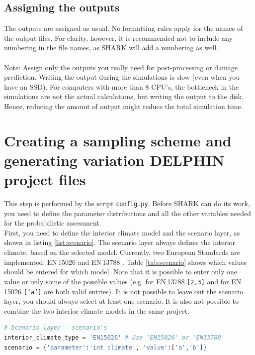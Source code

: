 \documentclass{article}
\newcommand{\file}[1]{{\small\texttt{#1}}}
\newcommand{\code}[1]{{\small\texttt{#1}}}
\begin{document}
\subsection{Assigning the outputs}
The outputs are assigned as usual. No formatting rules apply for the names of the output files. For clarity, however, it is recommended not to include any numbering in the file names, as SHARK will add a numbering as well. \\
\vspace{0cm}\\
Note: Assign only the outputs you really need for post-processing or damage prediction. Writing the output during the simulations is slow (even when you have an SSD). For computers with more than 8 CPU's, the bottleneck in the simulations are not the actual calculations, but writing the output to the disk. Hence, reducing the amount of output might reduce the total simulation time.

\FloatBarrier

\section{Creating a sampling scheme and generating variation DELPHIN project files}
\label{sec:sample+variation}
This step is performed by the script \file{config.py}. Before SHARK can do its work, you need to define the parameter distributions and all the other variables needed for the probabilistic assessment.\\
First, you need to define the interior climate model and the scenario layer, as shown in listing \ref{list:scenario}. The scenario layer always defines the interior climate, based on the selected model. Currently, two European Standards are implemented: EN\,15026 \citeyearpar{EN15026} and EN\,13788 \citeyearpar{EN13788}. Table \ref{tab:scenario} shows which values should be entered for which model. Note that it is possible to enter only one value or only some of the possible values (e.g. for EN\,13788 \code{[2,3]} and for EN\,15026 \code{['a']} are both valid entries). It is not possible to leave out the scenario layer, you should always select at least one scenario. It is also not possible to combine the two interior climate models in the same project.

\begin{minipage}{\linewidth}
\begin{lstlisting}[language=Python, caption=Define the scenario layer.]
# Scenario layer - scenario's
interior_climate_type = 'EN15026' # Use 'EN15026' or 'EN13788'
scenario = {'parameter':'int climate', 'value':['a','b']}
\end{lstlisting}
\label{list:scenario}
\end{minipage}
\end{document}
